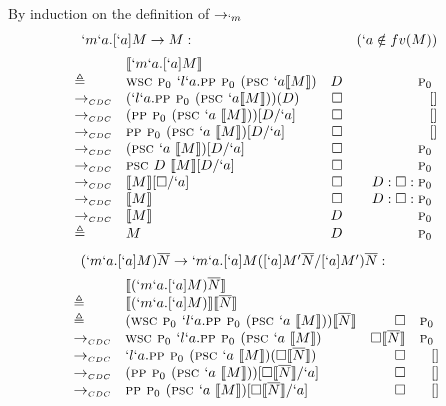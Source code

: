 \begin{Proof}
By induction on the definition of $\rightarrow_{`m}$
\[
\begin{array}{@{}llrr}
  \prooflabel{`m`a.[`a]M \to M} & (`a \notin fv(M)) \\
             & \tr{`m`a.[`a]M} \\
  \triangleq & \wsc \gp `l`a.\pp \gp (\psc `a \tr{M}) & D       & \gp \\
  \tocdc\    & (`l`a.\pp \gp (\psc `a \tr{M}))(D)     & \square & []     \\
  \tocdc\    & (\pp \gp (\psc `a\ \tr{M}))[D/`a]      & \square & []     \\
  \tocdc\    & \pp \gp (\psc `a\ \tr{M})[D/`a]        & \square & []     \\
  \tocdc\    & (\psc `a\ \tr{M})[D/`a]                & \square & \gp \\
  \tocdc\    & \psc D\ \tr{M}[D/`a]                   & \square & \gp \\
  \tocdc\    & \tr{M}[\square/`a]                     & \square & D:\square:\gp \\
  \tocdc\    & \tr{M}                                 & \square & D:\square:\gp \\
  \tocdc\    & \tr{M}                                 & D       & \gp \\
  \triangleq & M                                      & D       & \gp \\
\end{array}
\]
\[
\begin{array}{@{}llrr}
  \prooflabel{(`m`a.[`a]M)\mult{N} \to `m`a.[`a]M([`a]M'\mult{N}/[`a]M')\mult{N}} \\
             & \tr{(`m`a.[`a]M)\mult{N}} \\
  \triangleq & \tr{(`m`a.[`a]M)}\tr{\mult{N}} \\
  \triangleq & (\wsc \gp `l`a.\pp \gp (\psc `a\ \tr{M})) \tr{\mult{N}} & \square                & \gp \\
  \tocdc\    & \wsc \gp `l`a.\pp \gp (\psc `a\ \tr{M})                 & \square \tr{\mult{N}}  & \gp \\
  \tocdc\    & `l`a.\pp \gp (\psc `a\ \tr{M})(\square \tr{\mult{N}})   & \square                & [] \\
  \tocdc\    & (\pp \gp (\psc `a\ \tr{M}))[\square \tr{\mult{N}}/`a]   & \square                & [] \\
  \tocdc\    & \pp \gp (\psc `a\ \tr{M})[\square \tr{\mult{N}}/`a]     & \square                & [] \\

\end{array}\]
\end{Proof}
